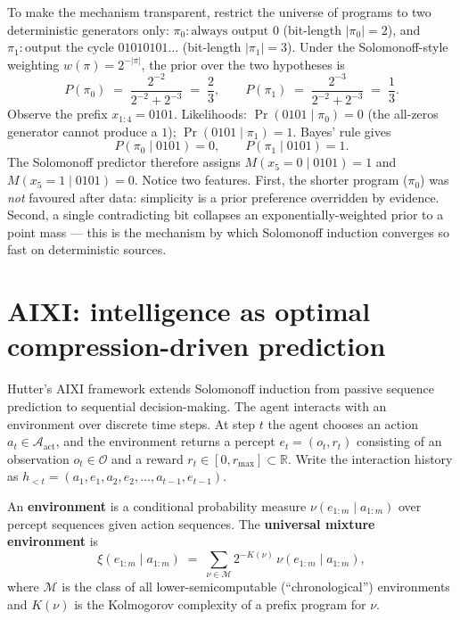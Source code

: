 \begin{example}
\label{ex:toy-solomonoff}
To make the mechanism transparent, restrict the universe of programs
to two deterministic generators only:
$\pi_0 : \text{always output }0$ (bit-length $|\pi_0| = 2$), and
$\pi_1 : \text{output the cycle }01010101\ldots$ (bit-length
$|\pi_1| = 3$). Under the Solomonoff-style weighting
$w(\pi) = 2^{-|\pi|}$, the prior over the two hypotheses is
\[
  P(\pi_0) \;=\; \frac{2^{-2}}{2^{-2} + 2^{-3}} \;=\; \frac{2}{3},
  \qquad
  P(\pi_1) \;=\; \frac{2^{-3}}{2^{-2} + 2^{-3}} \;=\; \frac{1}{3}.
\]
Observe the prefix $x_{1:4} = 0101$.
Likelihoods: $\Pr(0101 \mid \pi_0) = 0$ (the all-zeros generator cannot
produce a $1$); $\Pr(0101 \mid \pi_1) = 1$. Bayes' rule gives
\[
  P(\pi_0 \mid 0101) = 0, \qquad P(\pi_1 \mid 0101) = 1.
\]
The Solomonoff predictor therefore assigns
$M(x_5 = 0 \mid 0101) = 1$ and $M(x_5 = 1 \mid 0101) = 0$.
Notice two features. First, the shorter program ($\pi_0$) was
\emph{not} favoured after data: simplicity is a prior preference
overridden by evidence. Second, a single contradicting bit
collapses an exponentially-weighted prior to a point mass --- this is
the mechanism by which Solomonoff induction converges so fast on
deterministic sources.
\end{example}

\section{AIXI: intelligence as optimal compression-driven prediction}
\label{sec:aixi}

Hutter's AIXI framework \citep{hutter2005universal} extends Solomonoff
induction from passive sequence prediction to sequential
decision-making. The agent interacts with an environment over discrete
time steps. At step $t$ the agent chooses an action $a_t \in
\mathcal{A}_{\mathrm{act}}$, and the environment returns a percept
$e_t = (o_t, r_t)$ consisting of an observation $o_t \in \mathcal{O}$
and a reward $r_t \in [0, r_{\max}] \subset \mathbb{R}$.
Write the interaction history as
$h_{<t} = (a_1, e_1, a_2, e_2, \dots, a_{t-1}, e_{t-1})$.

An \textbf{environment} is a conditional probability measure
$\nu(e_{1:m} \mid a_{1:m})$ over percept sequences given action
sequences. The \textbf{universal mixture environment} is
\begin{equation}
  \xi(e_{1:m} \mid a_{1:m})
  \;=\; \sum_{\nu \in \mathcal{M}} 2^{-K(\nu)}\,\nu(e_{1:m} \mid a_{1:m}), \label{eq:xi}
\end{equation}
where $\mathcal{M}$ is the class of all lower-semicomputable
(``chronological'') environments and $K(\nu)$ is the Kolmogorov
complexity of a prefix program for $\nu$.

